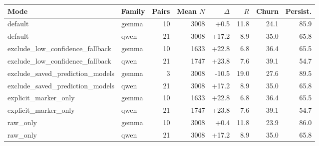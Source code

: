 \begin{tabular}{llrrrrrr}
\toprule
Mode & Family & Pairs & Mean $N$ & $\Delta$ & $R$ & Churn & Persist. \\
\midrule
default & gemma & 10 & 3008 & +0.5 & 11.8 & 24.1 & 85.9 \\
default & qwen & 21 & 3008 & +17.2 & 8.9 & 35.0 & 65.8 \\
exclude\_low\_confidence\_fallback & gemma & 10 & 1633 & +22.8 & 6.8 & 36.4 & 65.5 \\
exclude\_low\_confidence\_fallback & qwen & 21 & 1747 & +23.8 & 7.6 & 39.1 & 54.7 \\
exclude\_saved\_prediction\_models & gemma & 3 & 3008 & -10.5 & 19.0 & 27.6 & 89.5 \\
exclude\_saved\_prediction\_models & qwen & 21 & 3008 & +17.2 & 8.9 & 35.0 & 65.8 \\
explicit\_marker\_only & gemma & 10 & 1633 & +22.8 & 6.8 & 36.4 & 65.5 \\
explicit\_marker\_only & qwen & 21 & 1747 & +23.8 & 7.6 & 39.1 & 54.7 \\
raw\_only & gemma & 10 & 3008 & +0.4 & 11.8 & 23.9 & 86.0 \\
raw\_only & qwen & 21 & 3008 & +17.2 & 8.9 & 35.0 & 65.8 \\
\bottomrule
\end{tabular}
